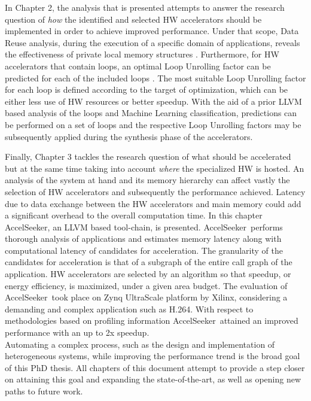 \documentclass[]{usiinfthesis}
\newcommand{\aseeker}{{AccelSeeker}}
\newcommand{\htsf}{{H.264}}
\newcommand{\SoTA}{{state-of-the-art}}
\begin{document}
In Chapter 2, the 
analysis that is presented attempts to answer the research question of {\em how} the identified and 
selected HW accelerators should be implemented in order to achieve improved performance. 
Under that scope, Data Reuse analysis, during the execution of a specific domain of applications, 
reveals the effectiveness of private local memory structures \cite{ZacharopoulosJan17}. 
Furthermore, for HW accelerators that contain loops, an optimal
Loop Unrolling factor can be predicted for each of the included loops \cite{ZacharopoulosJul18}. 
The most suitable Loop Unrolling factor
for each loop is defined according to the target of optimization, which can be either less use of HW
 resources or better speedup. With the aid of a prior LLVM based analysis 
 of the loops and Machine Learning classification, predictions can be performed on a set of loops and the respective 
Loop Unrolling factors may be subsequently applied during the synthesis phase of the accelerators. \par

Finally, Chapter 3 tackles the research question of what should be accelerated but at the same time
taking into account {\em where} the specialized HW is hosted.
An analysis of the system at hand and its memory hierarchy can affect vastly the selection
of HW accelerators and subsequently the performance achieved. Latency due to data exchange
between the HW accelerators and main memory could add a significant overhead to the overall 
computation time. In this chapter \aseeker, an LLVM based tool-chain, is presented. \aseeker\ 
performs thorough analysis of applications
and estimates memory latency along with computational latency of candidates for acceleration. The 
granularity of the candidates for acceleration is that of a subgraph of the entire call graph of 
the application. 
HW accelerators are selected by an algorithm so that speedup, or energy efficiency, is maximized, 
under a given area budget. The evaluation 
of \aseeker\ took place on Zynq UltraScale platform by Xilinx, considering a demanding and complex 
application such as \htsf. With respect to methodologies based on profiling information \aseeker\ 
attained an improved performance with an up to 2x speedup.\\
Automating a complex process, such as the design and implementation of heterogeneous systems, while
improving the performance trend is the broad goal of this PhD thesis. All chapters of this document 
attempt to provide a step closer on attaining this goal and expanding the \SoTA, as well as opening 
new paths to future work.
\end{document}
